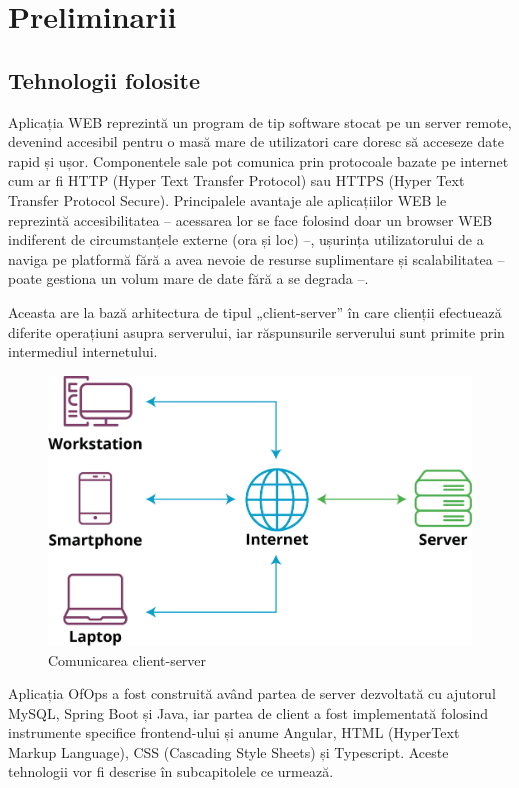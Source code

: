 \chapter{Preliminarii}

\section{Tehnologii folosite}
Aplicația WEB reprezintă un program de tip software stocat pe un server remote, devenind accesibil pentru o masă mare de utilizatori care doresc să acceseze date rapid și ușor. Componentele sale pot  comunica prin protocoale bazate pe internet cum ar fi HTTP (Hyper Text Transfer Protocol) sau HTTPS (Hyper Text Transfer Protocol Secure).\cite{citation1}  Principalele avantaje ale aplicațiilor WEB le reprezintă accesibilitatea – acessarea lor se face folosind doar un browser WEB indiferent de circumstanțele externe (ora și loc) –, ușurința utilizatorului de a naviga pe platformă fără a avea nevoie de resurse suplimentare și scalabilitatea – poate gestiona un volum mare de date fără a se degrada –.

Aceasta are la bază arhitectura de tipul „client-server” în care clienții efectuează diferite operațiuni asupra serverului, iar răspunsurile serverului sunt primite prin intermediul internetului. 

\begin{figure}[!htb]
    \centering
    \includegraphics[width=0.7\linewidth]{images/client-server-network.png}
    \caption{Comunicarea client-server}
    \label{fig:client-server}
\end{figure}

Aplicația OfOps a fost construită având partea de server dezvoltată cu ajutorul MySQL, Spring Boot și Java, iar partea de client a fost implementată folosind instrumente specifice frontend-ului și anume Angular, HTML (HyperText Markup Language), CSS (Cascading Style Sheets) și Typescript. Aceste tehnologii vor fi descrise în subcapitolele ce urmează. 

